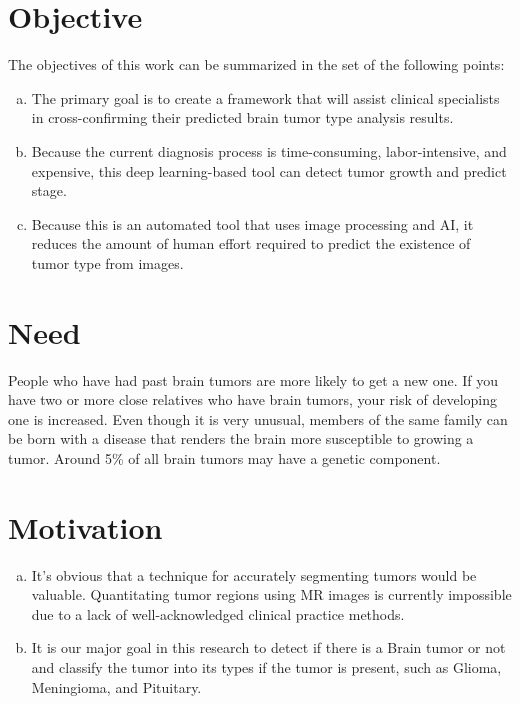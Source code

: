 \section{Objective}

The objectives of this work can be summarized in the set of the following points:

\begin{enumerate}[a)]
    \item The primary goal is to create a framework that will assist clinical specialists in cross-confirming their predicted brain tumor type analysis results.
    \item Because the current diagnosis process is time-consuming, labor-intensive, and expensive, this deep learning-based tool can detect tumor growth and predict stage.
    \item Because this is an automated tool that uses image processing and AI, it reduces the amount of human effort required to predict the existence of tumor type from images.
\end{enumerate}

\section{Need}

People who have had past brain tumors are more likely to get a new one. If you have two or more close relatives who have brain tumors, your risk of developing one is increased. Even though it is very unusual, members of the same family can be born with a disease that renders the brain more susceptible to growing a tumor. Around 5\% of all brain tumors may have a genetic component.

\section{Motivation}

\begin{enumerate}[a)]
    \item It's obvious that a technique for accurately segmenting tumors would be valuable. Quantitating tumor regions using MR images is currently impossible due to a lack of well-acknowledged clinical practice methods.
    \item It is our major goal in this research to detect if there is a Brain tumor or not and classify the tumor into its types if the tumor is present, such as Glioma, Meningioma, and Pituitary.
\end{enumerate}
